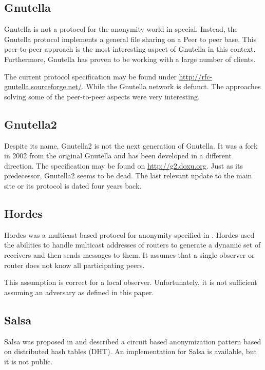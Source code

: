 \subsection{Gnutella}
Gnutella is not a protocol for the anonymity world in special. Instead, the Gnutella protocol implements a general file sharing on a Peer to peer base. This peer-to-peer approach is the most interesting aspect of Gnutella in this context. Furthermore, Gnutella has proven to be working with a large number of clients.

The current protocol specification may be found under \href{http://rfc-gnutella.sourceforge.net/developer/stable/index.html}{http://rfc-gnutella.sourceforge.net/}. While the Gnutella network is defunct. The approaches solving some of the peer-to-peer aspects were very interesting.

\subsection{Gnutella2}
Despite its name, Gnutella2 is not the next generation of Gnutella. It was a fork in 2002 from the original Gnutella and has been developed in a different direction. The specification may be found on \url{http://g2.doxu.org}. Just as its predecessor, Gnutella2 seems to be dead. The last relevant update to the main site or its protocol is dated four years back.

\subsection{Hordes}
Hordes was a multicast-based protocol for anonymity specified in \cite{Levine:2002}. Hordes used the abilities to handle multicast addresses of routers to generate a dynamic set of receivers and then sends messages to them. It assumes that a single observer or router does not know all participating peers. 

This assumption is correct for a local observer. Unfortunately, it is not sufficient assuming an adversary as defined in this paper.

\subsection{Salsa}
Salsa was proposed in \cite{Salsa} and described a circuit based anonymization pattern based on distributed hash tables (DHT). An implementation for Salsa is available, but it is not public.

